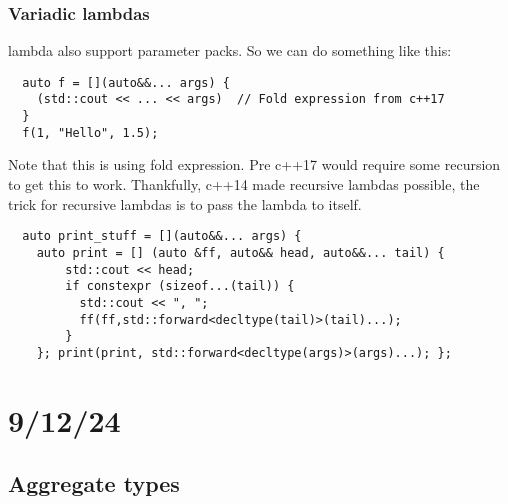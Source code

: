 \documentclass{report}
\begin{document}
\subsubsection*{Variadic lambdas}
lambda also support parameter packs. So we can do something like this:
\begin{verbatim}
  auto f = [](auto&&... args) {
    (std::cout << ... << args)  // Fold expression from c++17
  }
  f(1, "Hello", 1.5);
\end{verbatim}
Note that this is using fold expression. Pre c++17 would require some recursion to get this to work. Thankfully, c++14 made recursive lambdas possible, the trick for recursive lambdas is to pass the lambda to itself.
\begin{verbatim}
  auto print_stuff = [](auto&&... args) {
    auto print = [] (auto &ff, auto&& head, auto&&... tail) {
        std::cout << head;
        if constexpr (sizeof...(tail)) { 
          std::cout << ", ";
          ff(ff,std::forward<decltype(tail)>(tail)...);
        }
    }; print(print, std::forward<decltype(args)>(args)...); };
\end{verbatim}
\section{9/12/24}
\subsection{Aggregate types}
\end{document}
